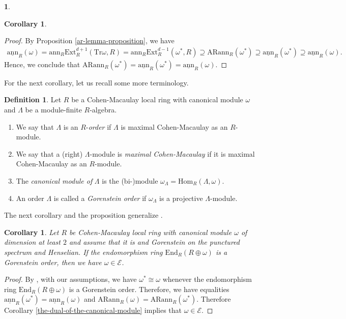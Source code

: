 \documentclass[12pt]{amsart}
\newcommand{\Ext}{\mathrm{Ext}}
\newcommand{\Hom}{\mathrm{Hom}}
\newcommand{\End}{\mathrm{End}}
\newcommand{\ann}{\mathrm{ann}}
\newcommand{\sann}{\underline{\mathrm{ann}}}
\newcommand{\arann}{\mathrm{ARann}}
\newcommand{\EE}{\mathcal{E}}
\newtheorem{corollary}[theorem]{Corollary}
\theoremstyle{definition}
\newtheorem{definition}[theorem]{Definition}
\newtheorem{chunk}[theorem]{}
\numberwithin{equation}{theorem}
\newcommand{\Tr}{\mathrm{Tr}}
\begin{document}
\begin{chunk}
\begin{corollary}
\end{corollary}
\begin{proof}
     By Proposition \ref{ar-lemma-proposition}, we have 
    \begin{align*}
        \sann_R(\omega) = \ann_R\Ext_R^{d+1}(\Tr \omega, R) = \ann_R\Ext_R^{d-1}(\omega^*, R) \supseteq \arann_R(\omega^*) \supseteq \sann_R(\omega^*) \supseteq \sann_R(\omega).
    \end{align*}
    Hence, we conclude that $\arann_R(\omega^*) = \sann_R(\omega^*) = \sann_R(\omega)$.
\end{proof}
For the next corollary, let us recall some more terminology.
\begin{definition}
    Let $R$ be a Cohen-Macaulay local ring with canonical module $\omega$ and $\Lambda$ be a module-finite $R$-algebra.
    \begin{enumerate}
        \item We say that $\Lambda$ is an $R$-\textit{order} if $\Lambda$ is maximal Cohen-Macaulay as an $R$-module.
        \item We say that a (right) $\Lambda$-module is \textit{maximal Cohen-Macaulay} if it is maximal Cohen-Macaulay as an $R$-module.
        \item The \textit{canonical module of} $\Lambda$ is the (bi-)module $\omega_\Lambda = \Hom_R(\Lambda, \omega)$.
        \item An order $\Lambda$ is called a \textit{Gorenstein order} if $\omega_\Lambda$ is a projective $\Lambda$-module.
    \end{enumerate}
\end{definition}
The next corollary and the proposition generalize \cite[Theorem 4.4]{Dao-Kobayashi-Takahashi}.
\begin{corollary}\label{Gorenstein-order-corollary}
    Let $R$ be Cohen-Macaulay local ring with canonical module $\omega$ of dimension at least $2$ and assume that it is and Gorenstein on the punctured spectrum and  Henselian. If the endomorphism ring $\End_R(R\oplus \omega)$ is a Gorenstein order, then we have $\omega \in \EE$.
\end{corollary}
\begin{proof}
    By \cite[Corollary 4.6]{Stangle}, with our assumptions, we have $\omega^* \cong \omega$ whenever the endomorphism ring $\End_R(R \oplus \omega)$ is a Gorenstein order. Therefore, we have equalities  $\sann_R(\omega^*) = \sann_R(\omega)$ and $\arann_R(\omega) = \arann_R(\omega^*)$. Therefore Corollary \ref{the-dual-of-the-canonical-module} implies that $\omega \in \EE$.

\end{proof}
\end{chunk}
\end{document}
